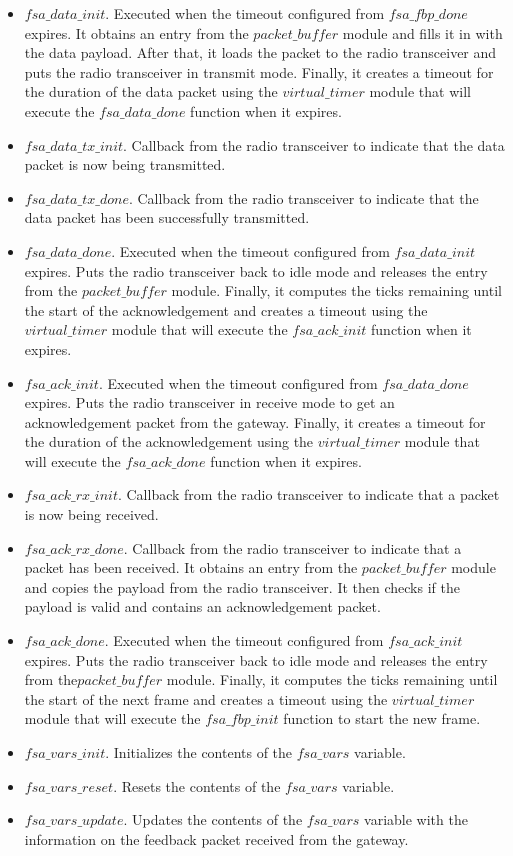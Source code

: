 \begin{itemize}
\item $fsa\_data\_init$. Executed when the timeout configured from $fsa\_fbp\_done$ expires. It obtains an entry from the $packet\_buffer$ module and fills it in with the data payload. After that, it loads the packet to the radio transceiver and puts the radio transceiver in transmit mode. Finally, it creates a timeout for the duration of the data packet using the $virtual\_timer$ module that will execute the $fsa\_data\_done$ function when it expires.
\item $fsa\_data\_tx\_init$. Callback from the radio transceiver to indicate that the data packet is now being transmitted.
\item $fsa\_data\_tx\_done$. Callback from the radio transceiver to indicate that the data packet has been successfully transmitted.
\item $fsa\_data\_done$. Executed when the timeout configured from $fsa\_data\_init$ expires. Puts the radio transceiver back to idle mode and releases the entry from the $packet\_buffer$ module. Finally, it computes the ticks remaining until the start of the acknowledgement and creates a timeout using the $virtual\_timer$ module that will execute the $fsa\_ack\_init$ function when it expires.

\item $fsa\_ack\_init$. Executed when the timeout configured from $fsa\_data\_done$ expires. Puts the radio transceiver in receive mode to get an acknowledgement packet from the gateway. Finally, it creates a timeout for the duration of the acknowledgement using the $virtual\_timer$ module that will execute the $fsa\_ack\_done$ function when it expires.
\item $fsa\_ack\_rx\_init$. Callback from the radio transceiver to indicate that a packet is now being received.
\item $fsa\_ack\_rx\_done$. Callback from the radio transceiver to indicate that a packet has been received. It obtains an entry from the $packet\_buffer$ module and copies the payload from the radio transceiver. It then checks if the payload is valid and contains an acknowledgement packet.
\item $fsa\_ack\_done$. Executed when the timeout configured from $fsa\_ack\_init$ expires. Puts the radio transceiver back to idle mode and releases the entry from the$packet\_buffer$ module. Finally, it computes the ticks remaining until the start of the next frame and creates a timeout using the $virtual\_timer$ module that will execute the $fsa\_fbp\_init$ function to start the new frame.

\item $fsa\_vars\_init$. Initializes the contents of the $fsa\_vars$ variable.
\item $fsa\_vars\_reset$. Resets the contents of the $fsa\_vars$ variable.
\item $fsa\_vars\_update$. Updates the contents of the $fsa\_vars$ variable with the information on the feedback packet received from the gateway.
\end{itemize}

